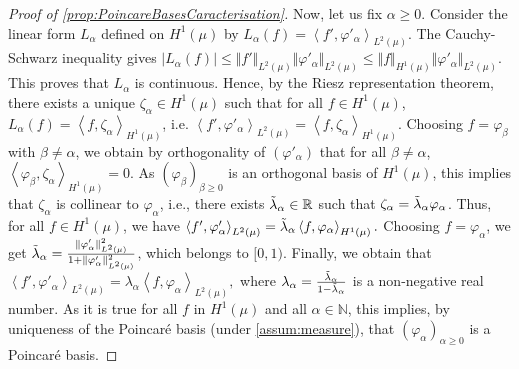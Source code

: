 \documentclass[a4paper,11pt]{article}
\newcommand{\innprod}[2]{\left\langle #1, #2 \right\rangle}
\theoremstyle{definition}
\theoremstyle{remark}
\theoremstyle{theorem}
\begin{document}
\begin{proof}[Proof of \cref{prop:PoincareBasesCaracterisation}]
	Now, let us fix $\alpha \geq 0$. Consider the linear form $L_\alpha$ defined on $H^1(\mu)$ by $L_\alpha(f) = \innprod{ f'}{ \varphi'_\alpha }_{L^2(\mu)}$. 
	The Cauchy-Schwarz inequality gives 
	$\vert L_\alpha(f) \vert 
	\leq 
	\Vert f' \Vert_{L^2(\mu)}
	\Vert \varphi'_\alpha \Vert_{L^2(\mu)}
	\leq 
	\Vert f \Vert_{H^1(\mu)}
	\Vert \varphi'_\alpha \Vert_{L^2(\mu)}$.
	This proves that $L_\alpha$ is continuous.
	Hence, by the Riesz representation theorem, there exists a unique $\zeta_\alpha \in H^1(\mu)$ such that for all $f \in H^1(\mu)$,  $L_\alpha(f) = \innprod{ f}{ \zeta_\alpha }_{H^1(\mu)}$, i.e. 
	$\innprod{ f'}{ \varphi'_\alpha }_{L^2(\mu)}
	= \innprod{f}{ \zeta_\alpha }_{H^1(\mu)}.$
	Choosing $f = \varphi_\beta$ with $\beta \neq \alpha$, we obtain by orthogonality of $(\varphi'_\alpha)$ that for all $\beta \neq \alpha$, 
	$\innprod{ \varphi_\beta}{ \zeta_\alpha }_{H^1(\mu)} = 0$.
	As $(\varphi_\beta)_{\beta \geq 0}$ is an orthogonal basis of $H^1(\mu)$, this implies that $\zeta_\alpha$ is collinear to $\varphi_\alpha$, i.e., there exists $\Tilde{\lambda}_\alpha \in \mathbb{R}$ such that $\zeta_\alpha = \Tilde{\lambda}_\alpha \varphi_\alpha$. 
	Thus, for all $f \in H^1(\mu)$, we have 
	$\innprod{ f'}{ \varphi'_\alpha }_{L^2(\mu)}
	= \Tilde{\lambda}_\alpha \innprod{ f}{ \varphi_\alpha }_{H^1(\mu)}.$
	Choosing $f = \varphi_\alpha$, we get 
	$\Tilde{\lambda}_\alpha = \frac{\Vert \varphi'_\alpha \Vert_{L^2(\mu)}^2} 
	{1 + \Vert \varphi'_\alpha \Vert_{L^2(\mu)}^2}$, which belongs to $[0, 1)$. 
	Finally, we obtain that 
	$\innprod{ f'}{ \varphi'_\alpha }_{L^2(\mu)}
	= \lambda_\alpha \innprod{ f}{ \varphi_\alpha }_{L^2(\mu)},$
	where $\lambda_\alpha = \frac{\Tilde{\lambda}_\alpha}{1 - \Tilde{\lambda}_\alpha}$ is a non-negative real number.
	As it is true for all $f$ in $H^1(\mu)$ and all $\alpha \in \mathbb{N}$, this implies, by uniqueness of the Poincar\'e basis (under \cref{assum:measure}), that $(\varphi_\alpha)_{\alpha \geq 0}$ is a Poincar\'e basis.
\end{proof}
\end{document}
